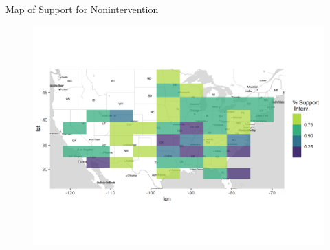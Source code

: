 \documentclass[12pt]{beamer}
\begin{document}

\begin{frame}{Map of Support for Nonintervention} 

\begin{figure}[htbp]
\centering
   \includegraphics[width = .95\textwidth]{noforce-map.png}
\end{figure}

\end{frame}




\end{document}
